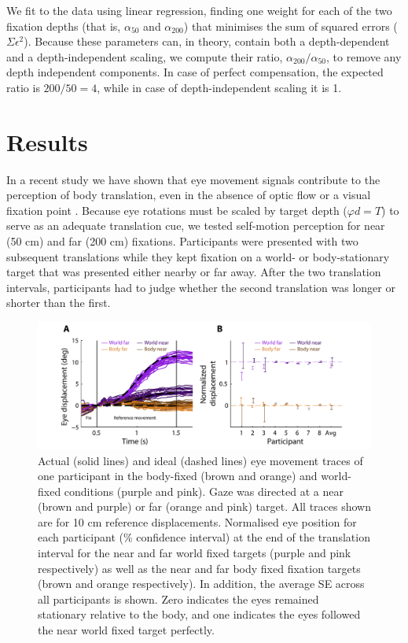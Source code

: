 We fit  to the data using linear regression, finding one weight for each of the two fixation depths (that is, $\alpha_{50}$ and $\alpha_{200}$) that minimises the sum of squared errors ($\Sigma \epsilon^2$). Because these parameters can, in theory, contain both a depth-dependent and a depth-independent scaling, we compute their ratio, $\alpha_{200}/\alpha_{50}$, to remove any depth independent components. In case of perfect compensation, the expected ratio is $200/50 = 4$, while in case of depth-independent scaling it is 1.




\section{Results}

In a recent study we have shown that eye movement signals contribute to the perception of body translation, even in the absence of optic flow or a visual fixation point \cite{clemens2015a}. Because eye rotations must be scaled by target depth ($\varphi d = T$) to serve as an adequate translation cue, we tested self-motion perception for near (50 \si{\centi\metre}) and far (200 \si{\centi\metre}) fixations. Participants were presented with two subsequent translations  while they kept fixation on a world- or body-stationary target that was presented either nearby or far away. After the two translation intervals, participants had to judge whether the second translation was longer or shorter than the first.

\begin{figure}
    \includegraphics[width=1.0\textwidth]{src/paper4/p4_figure2.pdf}

    \caption{ Actual (solid lines) and ideal (dashed lines) eye movement traces of one participant in the body-fixed (brown and orange) and world-fixed conditions (purple and pink). Gaze was directed at a near (brown and purple) or far (orange and pink) target. All traces shown are for 10 \si{\centi\metre} reference displacements.  Normalised eye position for each participant (\% confidence interval) at the end of the translation interval for the near and far world fixed targets (purple and pink respectively) as well as the near and far body fixed fixation targets (brown and orange respectively). In addition, the average \textpm SE across all participants is shown. Zero indicates the eyes remained stationary relative to the body, and one indicates the eyes followed the near world fixed target perfectly.}
    \label{p4:fig2}
\end{figure}

